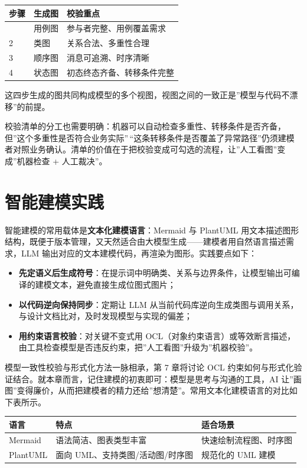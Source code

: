 \documentclass[
]{ctexbook}
\providecommand{\tightlist}{\setlength{\itemsep}{0pt}\setlength{\parskip}{0pt} }
\newcounter{none}
\begin{document}
{\def\LTcaptype{none} %
\begin{longtable}[]{@{}lll@{}}
\toprule\noalign{}
步骤 & 生成图 & 校验重点 \\
\midrule\noalign{}
\endhead
\bottomrule\noalign{}
\endlastfoot
1 & 用例图 & 参与者完整、用例覆盖需求 \\
2 & 类图 & 关系合法、多重性合理 \\
3 & 顺序图 & 消息可追溯、时序清晰 \\
4 & 状态图 & 初态终态齐备、转移条件完整 \\
\end{longtable}
}

这四步生成的图共同构成模型的多个视图，视图之间的一致正是''模型与代码不漂移''的前提。

校验清单的分工也需要明确：机器可以自动检查多重性、转移条件是否齐备，但''这个多重性是否符合业务实际''\,``这条转移条件是否覆盖了异常路径''仍须建模者对照业务确认。清单的价值在于把校验变成可勾选的流程，让''人工看图''变成''机器检查
+ 人工裁决''。

\section{智能建模实践}\label{ux667aux80fdux5efaux6a21ux5b9eux8df5}

智能建模的常用载体是\textbf{文本化建模语言}：Mermaid 与 PlantUML
用文本描述图形结构，既便于版本管理，又天然适合由大模型生成------建模者用自然语言描述需求，LLM
输出对应的文本建模代码，再渲染为图形。实践要点如下：

\begin{itemize}
\tightlist
\item
  \textbf{先定语义后生成符号}：在提示词中明确类、关系与边界条件，让模型输出可编译的建模文本，避免直接生成位图式图片；
\item
  \textbf{以代码逆向保持同步}：定期让 LLM
  从当前代码库逆向生成类图与调用关系，与设计文档比对，及时发现模型与实现的偏差；
\item
  \textbf{用约束语言校验}：对关键不变式用
  OCL（对象约束语言）或等效断言描述，由工具检查模型是否违反约束，把''人工看图''升级为''机器校验''。
\end{itemize}

模型一致性校验与形式化方法一脉相承，第 7 章将讨论 OCL
约束如何与形式化验证结合。就本章而言，记住建模的初衷即可：模型是思考与沟通的工具，AI
让''画图''变得廉价，从而把建模者的精力还给''想清楚''。常用文本化建模语言的对比如下表所示。

{\def\LTcaptype{none} %
\begin{longtable}[]{@{}lll@{}}
\toprule\noalign{}
语言 & 特点 & 适合场景 \\
\midrule\noalign{}
\endhead
\bottomrule\noalign{}
\endlastfoot
Mermaid & 语法简洁、图表类型丰富 & 快速绘制流程图、时序图 \\
PlantUML & 面向 UML、支持类图/活动图/时序图 & 规范化的 UML 建模 \\
\end{longtable}
}
\end{document}
